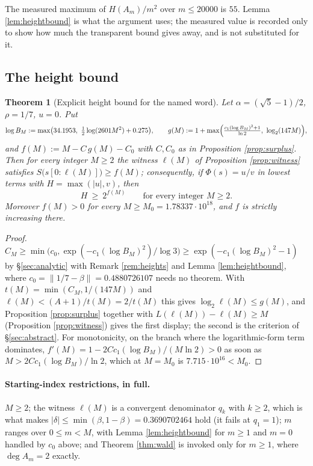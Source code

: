 \documentclass[11pt]{article}
\newtheorem{theorem}{Theorem}[section]
\begin{document}
The measured maximum of $H(A_m)/m^2$ over $m\le20000$ is $55$. Lemma \ref{lem:heightbound} is what the
argument uses; the measured value is recorded only to show how much the transparent bound gives away,
and is not substituted for it.

\subsection{The height bound}

\begin{theorem}[Explicit height bound for the named word]
\label{thm:fM}
Let $\alpha=(\sqrt5-1)/2$, $\rho=1/7$, $u=0$. Put
\[
  \log B_M:=\max\bigl(34.1953,\ \tfrac12\log(2601M^2)+0.275\bigr),\qquad
  g(M):=1+\max\Bigl(\tfrac{c_1(\log B_M)^2+1}{\ln2},\ \log_2(147M)\Bigr),
\]
and $f(M):=M-C\,g(M)-C_0$ with $C,C_0$ as in Proposition \ref{prop:surplus}. Then for every integer
$M\ge2$ the witness $\ell(M)$ of Proposition \ref{prop:witness} satisfies
$S\bigl(s[0{:}\ell(M)]\bigr)\ge f(M)$; consequently, if $\Phi(s)=u/v$ in lowest terms with
$H=\max(|u|,v)$, then
\[
  H\ \ge\ 2^{f(M)}\qquad\text{for every integer } M\ge2 .
\]
Moreover $f(M)>0$ for every $M\ge M_0=1.78337\cdot10^{18}$, and $f$ is strictly increasing there.
\end{theorem}

\begin{proof}
$C_M\ge\min\bigl(c_0,\exp(-c_1(\log B_M)^2)/\log3\bigr)\ge\exp(-c_1(\log B_M)^2-1)$ by
\S\ref{sec:analytic} with Remark \ref{rem:heights} and Lemma \ref{lem:heightbound}, where
$c_0=\lVert1/7-\beta\rVert=0.4880726107$ needs no theorem. With $t(M)=\min(C_M,1/(147M))$ and
$\ell(M)<(A+1)/t(M)=2/t(M)$ this gives $\log_2\ell(M)\le g(M)$, and Proposition \ref{prop:surplus}
together with $L(\ell(M))-\ell(M)\ge M$ (Proposition \ref{prop:witness}) gives the first display; the
second is the criterion of \S\ref{sec:abstract}. For monotonicity, on the branch where the
logarithmic-form term dominates, $f'(M)=1-2Cc_1(\log B_M)/(M\ln2)>0$ as soon as
$M>2Cc_1(\log B_M)/\ln2$, which at $M=M_0$ is $7.715\cdot10^{16}<M_0$.
\end{proof}

\paragraph{Starting-index restrictions, in full.}
$M\ge2$; the witness $\ell(M)$ is a convergent denominator $q_k$ with $k\ge2$, which is what makes
$|\delta|\le\min(\beta,1-\beta)=0.3690702464$ hold (it fails at $q_1=1$); $m$ ranges over
$0\le m<M$, with Lemma \ref{lem:heightbound} for $m\ge1$ and $m=0$ handled by $c_0$ above; and
Theorem \ref{thm:wald} is invoked only for $m\ge1$, where $\deg A_m=2$ exactly.
\end{document}
